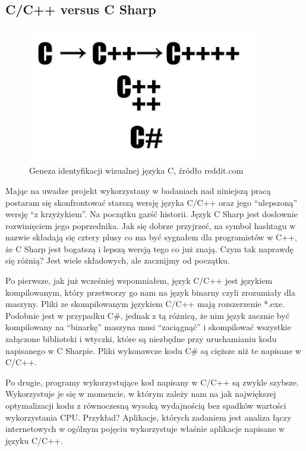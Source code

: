 \documentclass{article}
\begin{document}
	\subsection{C/C++ versus C Sharp}
	\begin{figure}
		\centering
		\includegraphics[width=10cm]{cvscsharp}
		\caption{Geneza identyfikacji wizualnej języka C, źródło reddit.com}
	\end{figure}
	\par
	Mając na uwadze projekt wykorzystany w badaniach nad niniejszą pracą postaram się skonfrontować starszą wersję języka C/C++ oraz jego “ulepszoną” wersję “z krzyżykiem”. Na początku garść historii. Język C Sharp jest dosłownie rozwinięciem jego poprzednika. Jak się dobrze przyjrzeć, na symbol hashtagu w nazwie składają się cztery plusy co ma być sygnałem dla programistów w C++, że C Sharp jest bogatszą i lepszą wersją tego co już znają. Czym tak naprawdę się różnią? Jest wiele składowych, ale zacznijmy od początku.
	\par
	Po pierwsze, jak już wcześniej wspomniałem, język C/C++ jest językiem kompilowanym, który przetworzy go nam na język binarny czyli zrozumiały dla maszyny. Pliki ze skompilowanym językiem C/C++ mają rozszerzenie *.exe. Podobnie jest w przypadku C#, jednak z tą różnicą, że nim język zacznie być kompilowany na “binarkę” maszyna musi “zaciągnąć” i skompilować wszystkie załączone biblioteki i wtyczki, które są niezbędne przy uruchamianiu kodu napisanego w C Sharpie. Pliki wykonawcze kodu C# są cięższe niż te napisane w C/C++.
	\par
	Po drugie, programy wykorzystujące kod napisany w C/C++ są zwykle szybsze. Wykorzystuje je się w momencie, w którym zależy nam na jak największej optymalizacji kodu z równoczesną wysoką wydajnością bez spadków wartości wykorzystania CPU. Przykład? Aplikacje, których zadaniem jest analiza łączy internetowych w ogólnym pojęciu wykorzystuje właśnie aplikacje napisane w języku C/C++.
	\par
\end{document}
